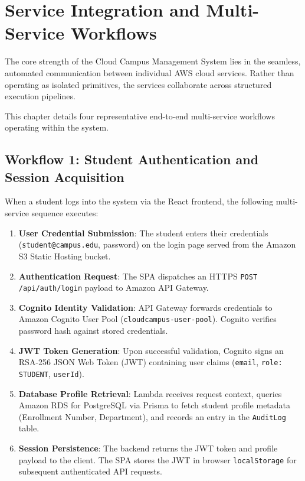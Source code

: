 \chapter{Service Integration and Multi-Service Workflows}
\label{chap:integration}

The core strength of the Cloud Campus Management System lies in the seamless, automated communication between individual AWS cloud services. Rather than operating as isolated primitives, the services collaborate across structured execution pipelines.

This chapter details four representative end-to-end multi-service workflows operating within the system.

\section{Workflow 1: Student Authentication and Session Acquisition}
When a student logs into the system via the React frontend, the following multi-service sequence executes:
\begin{enumerate}
    \item \textbf{User Credential Submission}: The student enters their credentials (\texttt{student@campus.edu}, password) on the login page served from the Amazon S3 Static Hosting bucket.
    \item \textbf{Authentication Request}: The SPA dispatches an HTTPS \texttt{POST /api/auth/login} payload to Amazon API Gateway.
    \item \textbf{Cognito Identity Validation}: API Gateway forwards credentials to Amazon Cognito User Pool (\texttt{cloudcampus-user-pool}). Cognito verifies password hash against stored credentials.
    \item \textbf{JWT Token Generation}: Upon successful validation, Cognito signs an RSA-256 JSON Web Token (JWT) containing user claims (\texttt{email}, \texttt{role: STUDENT}, \texttt{userId}).
    \item \textbf{Database Profile Retrieval}: Lambda receives request context, queries Amazon RDS for PostgreSQL via Prisma to fetch student profile metadata (Enrollment Number, Department), and records an entry in the \texttt{AuditLog} table.
    \item \textbf{Session Persistence}: The backend returns the JWT token and profile payload to the client. The SPA stores the JWT in browser \texttt{localStorage} for subsequent authenticated API requests.
\end{enumerate}

